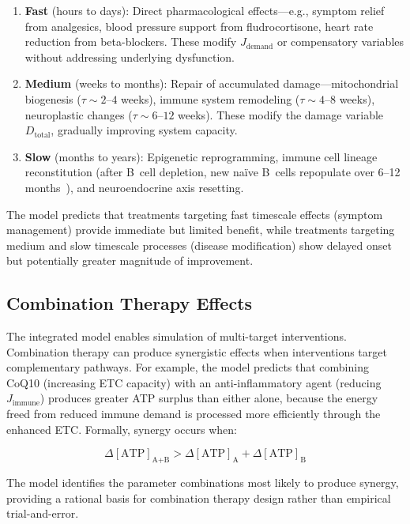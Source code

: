 \begin{enumerate}
    \item \textbf{Fast} (hours to days): Direct pharmacological effects---e.g., symptom relief from analgesics, blood pressure support from fludrocortisone, heart rate reduction from beta-blockers. These modify $J_{\text{demand}}$ or compensatory variables without addressing underlying dysfunction.
    \item \textbf{Medium} (weeks to months): Repair of accumulated damage---mitochondrial biogenesis ($\tau \sim 2$--$4$ weeks), immune system remodeling ($\tau \sim 4$--$8$ weeks), neuroplastic changes ($\tau \sim 6$--$12$ weeks). These modify the damage variable $D_{\text{total}}$, gradually improving system capacity.
    \item \textbf{Slow} (months to years): Epigenetic reprogramming, immune cell lineage reconstitution (after B~cell depletion, new na\"ive B~cells repopulate over 6--12 months~\cite{Fluge2011rituximab}), and neuroendocrine axis resetting.
\end{enumerate}

The model predicts that treatments targeting fast timescale effects (symptom management) provide immediate but limited benefit, while treatments targeting medium and slow timescale processes (disease modification) show delayed onset but potentially greater magnitude of improvement.

\subsection{Combination Therapy Effects}
\label{sec:combination-therapy}

The integrated model enables simulation of multi-target interventions. Combination therapy can produce synergistic effects when interventions target complementary pathways. For example, the model predicts that combining CoQ10 (increasing ETC capacity) with an anti-inflammatory agent (reducing $J_{\text{immune}}$) produces greater ATP surplus than either alone, because the energy freed from reduced immune demand is processed more efficiently through the enhanced ETC. Formally, synergy occurs when:

\begin{equation}
\label{eq:synergy}
\Delta[\text{ATP}]_{\text{A+B}} > \Delta[\text{ATP}]_{\text{A}} + \Delta[\text{ATP}]_{\text{B}}
\end{equation}

The model identifies the parameter combinations most likely to produce synergy, providing a rational basis for combination therapy design rather than empirical trial-and-error.

